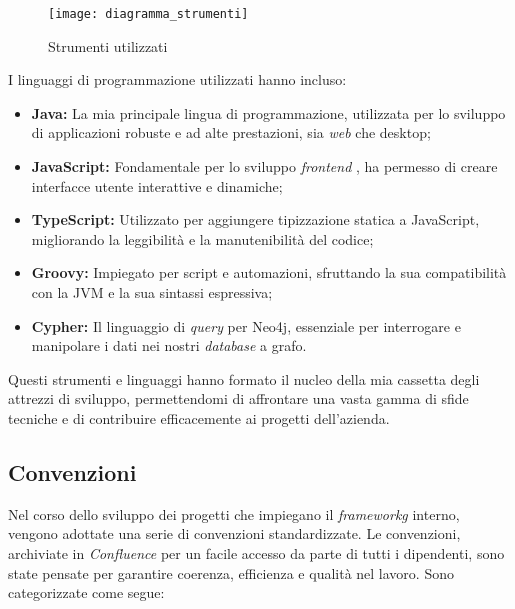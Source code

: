 \begin{figure}[!h] 
  \centering 
  \texttt{[image: diagramma\_strumenti]} 
  \caption{Strumenti utilizzati}
  \label{fig:diagramma_strumenti}
\end{figure}
\newpage

I linguaggi di programmazione utilizzati hanno incluso:

\begin{itemize}
\item \textbf{Java:} La mia principale lingua di programmazione, utilizzata per lo sviluppo di applicazioni robuste e ad alte prestazioni, sia \textit{web} che desktop;

\item \textbf{JavaScript:} Fondamentale per lo sviluppo \textit{frontend}  , ha permesso di creare interfacce utente interattive e dinamiche;

\item \textbf{TypeScript:} Utilizzato per aggiungere tipizzazione statica a JavaScript, migliorando la leggibilità e la manutenibilità del codice;

\item \textbf{Groovy:} Impiegato per script e automazioni, sfruttando la sua compatibilità con la \gls{JVM} e la sua sintassi espressiva;

\item \textbf{Cypher:} Il linguaggio di \textit{query} per Neo4j, essenziale per interrogare e manipolare i dati nei nostri \textit{database} a grafo.
\end{itemize}

Questi strumenti e linguaggi hanno formato il nucleo della mia cassetta degli attrezzi di sviluppo, permettendomi di affrontare una vasta gamma di sfide tecniche e di contribuire efficacemente 
ai progetti dell'azienda.

\subsection{Convenzioni}
Nel corso dello sviluppo dei progetti che impiegano il \textit{frameworkg} interno, vengono adottate una serie di convenzioni standardizzate. 
Le convenzioni, archiviate in \textit{Confluence} per un facile accesso da parte di tutti i dipendenti, 
sono state pensate per garantire coerenza, efficienza e qualità nel lavoro. Sono categorizzate come segue:

